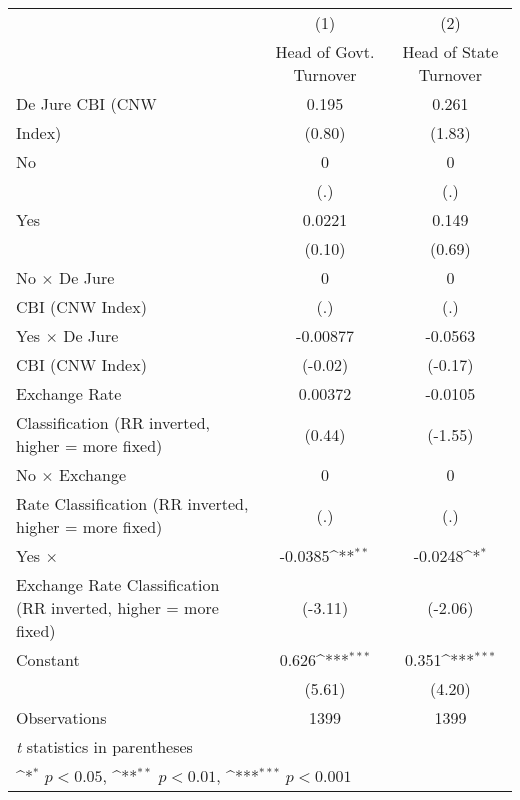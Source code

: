 {
\def\sym#1{\ifmmode^{#1}\else\(^{#1}\)\fi}
\begin{tabular}{l*{2}{c}}
\hline\hline
                    &\multicolumn{1}{c}{(1)}&\multicolumn{1}{c}{(2)}\\
                    &\multicolumn{1}{c}{Head of Govt. Turnover}&\multicolumn{1}{c}{Head of State Turnover}\\
\hline
De Jure CBI (CNW    &       0.195         &       0.261         \\
Index)              &      (0.80)         &      (1.83)         \\
[1em]
No                  &           0         &           0         \\
                    &         (.)         &         (.)         \\
[1em]
Yes                 &      0.0221         &       0.149         \\
                    &      (0.10)         &      (0.69)         \\
[1em]
No $\times$ De Jure &           0         &           0         \\
CBI (CNW Index)     &         (.)         &         (.)         \\
[1em]
Yes $\times$ De Jure&    -0.00877         &     -0.0563         \\
CBI (CNW Index)     &     (-0.02)         &     (-0.17)         \\
[1em]
Exchange Rate       &     0.00372         &     -0.0105         \\
Classification (RR inverted, higher = more fixed)&      (0.44)         &     (-1.55)         \\
[1em]
No $\times$ Exchange&           0         &           0         \\
Rate Classification (RR inverted, higher = more fixed)&         (.)         &         (.)         \\
[1em]
Yes $\times$        &     -0.0385\sym{**} &     -0.0248\sym{*}  \\
Exchange Rate Classification (RR inverted, higher = more fixed)&     (-3.11)         &     (-2.06)         \\
[1em]
Constant            &       0.626\sym{***}&       0.351\sym{***}\\
                    &      (5.61)         &      (4.20)         \\
\hline
Observations        &        1399         &        1399         \\
\hline\hline
\multicolumn{3}{l}{\footnotesize \textit{t} statistics in parentheses}\\
\multicolumn{3}{l}{\footnotesize \sym{*} \(p<0.05\), \sym{**} \(p<0.01\), \sym{***} \(p<0.001\)}\\
\end{tabular}
}
